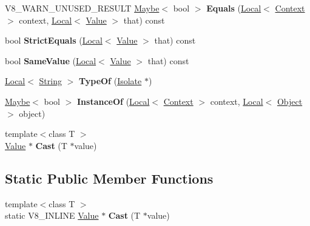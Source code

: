 \begin{DoxyCompactItemize}
\item 
\mbox{\label{classv8_1_1Value_a7d6045d6333598e79c9ab7d2898a9eb5}} 
V8\+\_\+\+W\+A\+R\+N\+\_\+\+U\+N\+U\+S\+E\+D\+\_\+\+R\+E\+S\+U\+LT \mbox{\hyperlink{classv8_1_1Maybe}{Maybe}}$<$ bool $>$ {\bfseries Equals} (\mbox{\hyperlink{classv8_1_1Local}{Local}}$<$ \mbox{\hyperlink{classv8_1_1Context}{Context}} $>$ context, \mbox{\hyperlink{classv8_1_1Local}{Local}}$<$ \mbox{\hyperlink{classv8_1_1Value}{Value}} $>$ that) const
\item 
\mbox{\label{classv8_1_1Value_aca359114a4beedaf2858254013d0279e}} 
bool {\bfseries Strict\+Equals} (\mbox{\hyperlink{classv8_1_1Local}{Local}}$<$ \mbox{\hyperlink{classv8_1_1Value}{Value}} $>$ that) const
\item 
\mbox{\label{classv8_1_1Value_a7c90dc5947b8b99b9089a020fff6d86d}} 
bool {\bfseries Same\+Value} (\mbox{\hyperlink{classv8_1_1Local}{Local}}$<$ \mbox{\hyperlink{classv8_1_1Value}{Value}} $>$ that) const
\item 
\mbox{\label{classv8_1_1Value_aa216d09720605b79b1d429cf1eef6050}} 
\mbox{\hyperlink{classv8_1_1Local}{Local}}$<$ \mbox{\hyperlink{classv8_1_1String}{String}} $>$ {\bfseries Type\+Of} (\mbox{\hyperlink{classv8_1_1Isolate}{Isolate}} $\ast$)
\item 
\mbox{\label{classv8_1_1Value_a48f7a0f11ca7ae0e8b13968e7b00f76a}} 
\mbox{\hyperlink{classv8_1_1Maybe}{Maybe}}$<$ bool $>$ {\bfseries Instance\+Of} (\mbox{\hyperlink{classv8_1_1Local}{Local}}$<$ \mbox{\hyperlink{classv8_1_1Context}{Context}} $>$ context, \mbox{\hyperlink{classv8_1_1Local}{Local}}$<$ \mbox{\hyperlink{classv8_1_1Object}{Object}} $>$ object)
\item 
\mbox{\label{classv8_1_1Value_ac2142bb3ec6527633c4f9133e80cdc19}} 
{\footnotesize template$<$class T $>$ }\\\mbox{\hyperlink{classv8_1_1Value}{Value}} $\ast$ {\bfseries Cast} (T $\ast$value)
\end{DoxyCompactItemize}
\subsection*{Static Public Member Functions}
\begin{DoxyCompactItemize}
\item 
\mbox{\label{classv8_1_1Value_ae5aa9b54ebed55819c3a4b2a3eb5fe12}} 
{\footnotesize template$<$class T $>$ }\\static V8\+\_\+\+I\+N\+L\+I\+NE \mbox{\hyperlink{classv8_1_1Value}{Value}} $\ast$ {\bfseries Cast} (T $\ast$value)
\end{DoxyCompactItemize}


